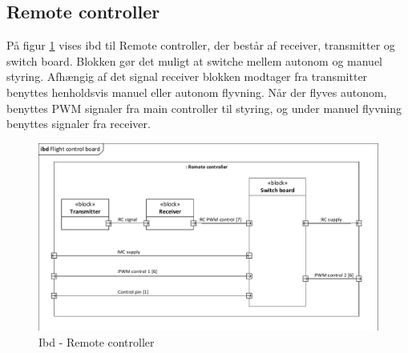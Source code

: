 \subsection{Remote controller}

På figur \ref{fig:ibd_remotecontroller} vises ibd til Remote controller, der består af receiver, transmitter og switch board. Blokken gør det muligt at switche mellem autonom og manuel styring. Afhængig af det signal receiver blokken modtager fra transmitter benyttes henholdsvis manuel eller autonom flyvning. Når der flyves autonom, benyttes PWM signaler fra main controller til styring, og under manuel flyvning benyttes signaler fra receiver.

\begin{figure}[H]
\centering
\includegraphics[width=1\textwidth]{Billeder/IBD/ibd7_remotecontroller.pdf}
\vspace{-0.5cm}
\caption{Ibd - Remote controller}
\label{fig:ibd_remotecontroller}
\end{figure}


